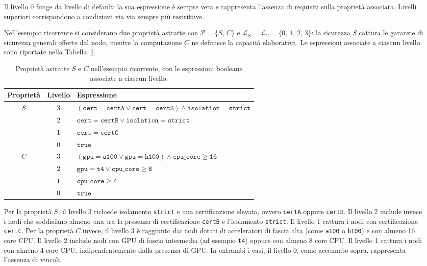Il livello $0$ funge da livello di default: la sua espressione è sempre vera e rappresenta l'assenza di requisiti sulla proprietà associata. Livelli superiori corrispondono a condizioni via via sempre più restrittive. 

Nell'esempio ricorrente si considerano due proprietà astratte con $\mathcal{P} = \{S,\, C\}$ e $\mathcal{L}_S = \mathcal{L}_C = \{0,\, 1,\, 2,\, 3\}$: la sicurezza $S$ cattura le garanzie di sicurezza generali offerte dal nodo, mentre la computazione $C$ ne definisce la capacità elaborativa. Le espressioni associate a ciascun livello sono riportate nella Tabella~\ref{tab:proprieta_nodi}.

\begin{table}[ht]
    \centering
    \begin{tabular}{ccp{10cm}}
        \toprule
        \textbf{Proprietà} & \textbf{Livello} & \textbf{Espressione} \\
        \midrule
        \multirow{4}{*}{$S$}
          & $3$ & $(\mathtt{cert=certA} \lor \mathtt{cert=certB}) \land \mathtt{isolation=strict}$ \\
          & $2$ & $\mathtt{cert=certB} \lor \mathtt{isolation=strict}$ \\
          & $1$ & $\mathtt{cert=certC}$ \\
          & $0$ & $\mathtt{true}$ \\
        \midrule
        \multirow{4}{*}{$C$}
          & $3$ & $(\mathtt{gpu=a100} \lor \mathtt{gpu=h100}) \land \mathtt{cpu\_core \geq 16}$ \\
          & $2$ & $\mathtt{gpu=t4} \lor \mathtt{cpu\_core \geq 8}$ \\
          & $1$ & $\mathtt{cpu\_core \geq 4}$ \\
          & $0$ & $\mathtt{true}$ \\
        \bottomrule
    \end{tabular}
    \caption{Proprietà astratte $S$ e $C$ nell'esempio ricorrente, con le espressioni booleane associate a ciascun livello.}
    \label{tab:proprieta_nodi}
\end{table}

Per la proprietà $S$, il livello 3 richiede isolamento \texttt{strict} e una certificazione elevata, ovvero \texttt{certA} oppure \texttt{certB}. Il livello 2 include invece i nodi che soddisfano almeno una tra la presenza di certificazione \texttt{certB} e l'isolamento \texttt{strict}. Il livello 1 cattura i nodi con certificazione \texttt{certC}. Per la proprietà $C$ invece, il livello 3 è raggiunto dai nodi dotati di acceleratori di fascia alta (come \texttt{a100} o \texttt{h100}) e con almeno 16 core CPU. Il livello 2 include nodi con GPU di fascia intermedia (ad esempio \texttt{t4}) oppure con almeno 8 core CPU. Il livello 1 cattura i nodi con almeno 4 core CPU, indipendentemente dalla presenza di GPU. In entrambi i casi, il livello $0$, come accennato sopra, rappresenta l'assenza di vincoli.

